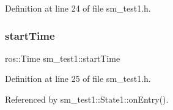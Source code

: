 Definition at line 24 of file sm\+\_\+test1.\+h.

\mbox{\label{namespacesm__test1_abb9998c780883187824713b717353f85}} 
\subsubsection{\texorpdfstring{start\+Time}{startTime}}
{\footnotesize\ttfamily ros\+::\+Time sm\+\_\+test1\+::start\+Time}



Definition at line 25 of file sm\+\_\+test1.\+h.



Referenced by sm\+\_\+test1\+::\+State1\+::on\+Entry().

